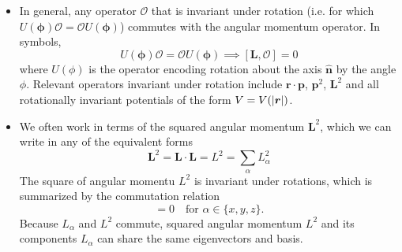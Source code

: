 \documentclass[11pt, a4paper]{article}
\renewcommand{\vec}[1]{\bm{#1}}  %
\newcommand{\uvec}[1]{\hat{\vec{#1}}}  %
\renewcommand{\r}{\vec{r}}  %
\renewcommand{\L}{\vec{L}}  %
\renewcommand{\O}{\mathcal{O}}  %
\begin{document}
\begin{itemize}
\begin{quote}
    \end{quote}

	
	\item In general, any operator $ \O $ that is invariant under rotation (i.e. for which $ U(\vec{\phi})\O = \O U(\vec{\phi})  $) commutes with the angular momentum operator. In symbols,
	\begin{equation*}
		U(\vec{\phi})\O = \O U(\vec{\phi})  \implies [\L, \O] = 0
	\end{equation*}
    where $ U(\phi) $ is the operator encoding rotation about the axis $ \uvec{n} $ by the angle $ \phi $. Relevant operators invariant under rotation include $ \r \cdot \vec{p} $, $ \vec{p}^{2} $, $ \L^{2} $ and all rotationally invariant potentials of the form $ V = V(\abs{\r}) $. 
	
	\item We often work in terms of the squared angular momentum $ \L^{2} $, which we can write in any of the equivalent forms	
    \begin{equation*}
		\L^{2} = \L \cdot \L = L^{2} = \sum_{\alpha} L_{\alpha}^{2}
	\end{equation*}
	The square of angular momentu $ L^{2} $ is invariant under rotations, which is summarized by the commutation relation
	\begin{equation*}
		[L_{\alpha}, L^{2}] = 0 \quad \text{for } \alpha \in \{x, y, z\}.
	\end{equation*}
	Because $ L_{\alpha} $ and $ L^{2} $ commute, squared angular momentum $ L^{2} $ and its components $ L_{\alpha} $ can share the same eigenvectors and basis.
	
\end{itemize}
\end{document}
